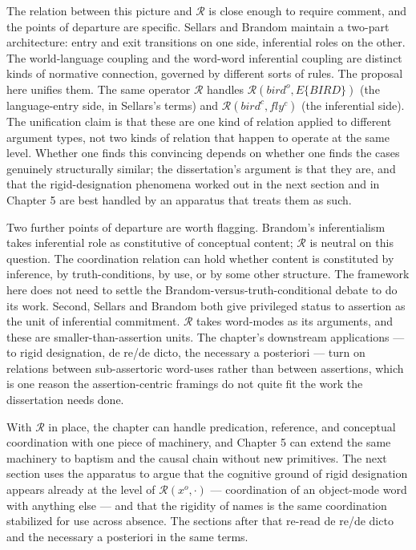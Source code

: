 \documentclass[12pt,a4paper]{article}
\begin{document}
The relation between this picture and \(\mathcal{R}\) is close enough to require comment, and the points of departure are specific. Sellars and Brandom maintain a two-part architecture: entry and exit transitions on one side, inferential roles on the other. The world-language coupling and the word-word inferential coupling are distinct kinds of normative connection, governed by different sorts of rules. The proposal here unifies them. The same operator \(\mathcal{R}\) handles \(\mathcal{R}(bird^o, E\{BIRD\})\) (the language-entry side, in Sellars's terms) and \(\mathcal{R}(bird^c, fly^c)\) (the inferential side). The unification claim is that these are one kind of relation applied to different argument types, not two kinds of relation that happen to operate at the same level. Whether one finds this convincing depends on whether one finds the cases genuinely structurally similar; the dissertation's argument is that they are, and that the rigid-designation phenomena worked out in the next section and in Chapter 5 are best handled by an apparatus that treats them as such.

Two further points of departure are worth flagging. Brandom's inferentialism takes inferential role as constitutive of conceptual content; \(\mathcal{R}\) is neutral on this question. The coordination relation can hold whether content is constituted by inference, by truth-conditions, by use, or by some other structure. The framework here does not need to settle the Brandom-versus-truth-conditional debate to do its work. Second, Sellars and Brandom both give privileged status to assertion as the unit of inferential commitment. \(\mathcal{R}\) takes word-modes as its arguments, and these are smaller-than-assertion units. The chapter's downstream applications --- to rigid designation, de re/de dicto, the necessary a posteriori --- turn on relations between sub-assertoric word-uses rather than between assertions, which is one reason the assertion-centric framings do not quite fit the work the dissertation needs done.

With \(\mathcal{R}\) in place, the chapter can handle predication, reference, and conceptual coordination with one piece of machinery, and Chapter 5 can extend the same machinery to baptism and the causal chain without new primitives. The next section uses the apparatus to argue that the cognitive ground of rigid designation appears already at the level of \(\mathcal{R}(x^o, \cdot)\) --- coordination of an object-mode word with anything else --- and that the rigidity of names is the same coordination stabilized for use across absence. The sections after that re-read de re/de dicto and the necessary a posteriori in the same terms.
\end{document}
